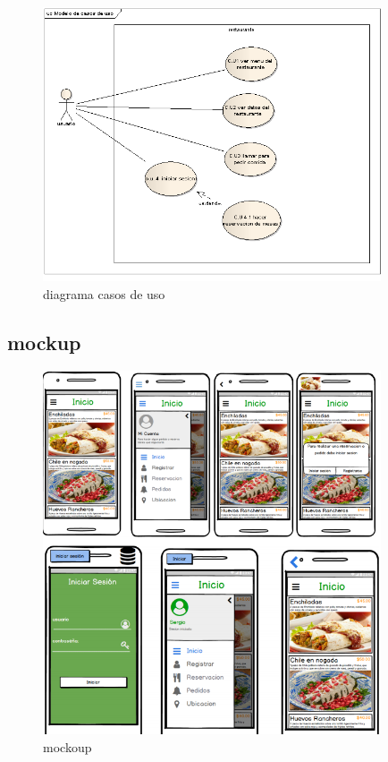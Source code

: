 \begin{figure}[H]
\caption{diagrama casos de uso}
\centering
\includegraphics[width=10cm]{imagenes/casosdeuso}

\end{figure}
\subsection{mockup}



\begin{figure}[H]
\caption{mockoup}
\centering
\includegraphics[width=10cm]{imagenes/mockup1}

\end{figure}

